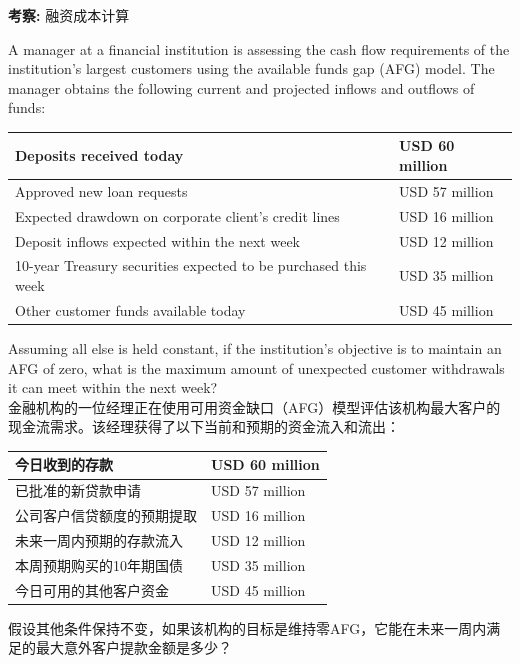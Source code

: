 \documentclass{article}
\newcounter{question} %
\newcommand{\checklist}[1]{
    \textbf{考察:} #1 \par %
    \addcontentsline{toc}{subsection}{题号\thequestion 考察: #1} %
    \vspace{2em} %
}
\begin{document}
\checklist{融资成本计算}



\begin{question}
    A manager at a financial institution is assessing the cash flow requirements of the institution's largest customers using the available funds gap (AFG) model. The manager obtains the following current and projected inflows and outflows of funds:

    \begin{table}[htbp]
        \centering
        \begin{tabular}{|l|l|}
        \hline
        Deposits received today & USD 60 million \\
        \hline
        Approved new loan requests & USD 57 million \\
        \hline
        Expected drawdown on corporate client's credit lines & USD 16 million \\
        \hline
        Deposit inflows expected within the next week & USD 12 million \\
        \hline
        10-year Treasury securities expected to be purchased this week & USD 35 million \\
        \hline
        Other customer funds available today & USD 45 million \\
        \hline
        \end{tabular}
    \end{table}

    Assuming all else is held constant, if the institution's objective is to maintain an AFG of zero, what is the maximum amount of unexpected customer withdrawals it can meet within the next week?
    \\ 金融机构的一位经理正在使用可用资金缺口（AFG）模型评估该机构最大客户的现金流需求。该经理获得了以下当前和预期的资金流入和流出：

    \begin{table}[htbp]
        \centering
        \begin{tabular}{|l|l|}
        \hline
        今日收到的存款 & USD 60 million \\
        \hline
        已批准的新贷款申请 & USD 57 million \\
        \hline
        公司客户信贷额度的预期提取 & USD 16 million \\
        \hline
        未来一周内预期的存款流入 & USD 12 million \\
        \hline
        本周预期购买的10年期国债 & USD 35 million \\
        \hline
        今日可用的其他客户资金 & USD 45 million \\
        \hline
        \end{tabular}
    \end{table}
    假设其他条件保持不变，如果该机构的目标是维持零AFG，它能在未来一周内满足的最大意外客户提款金额是多少？
\end{question}
\end{document}
